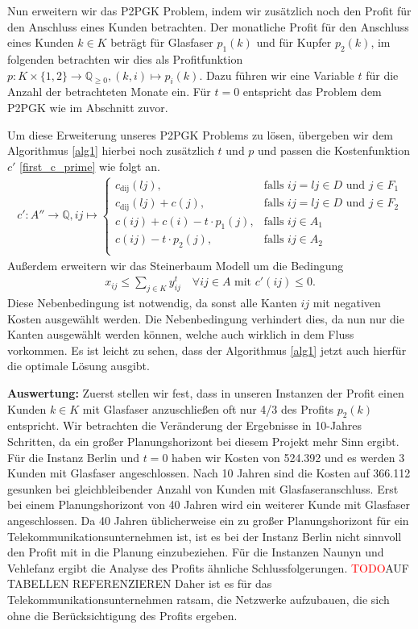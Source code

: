 \documentclass[11pt,a4paper]{article}
\newcommand{\Q}{\mathbb{Q}}
\newcommand{\TODO}{\textcolor{red}{TODO}}
\theoremstyle{my_th_style1}
\begin{document}
Nun erweitern wir das P2PGK Problem, indem wir zusätzlich noch den Profit für den Anschluss eines Kunden betrachten.
Der monatliche Profit für den Anschluss eines Kunden $k \in K$ beträgt für Glasfaser $p_1(k)$ und für Kupfer $p_2(k)$, im folgenden betrachten wir dies als Profitfunktion $p:K \times \{1,2\} \rightarrow \Q_{ \geq 0 },(k,i) \mapsto p_i(k)$.
Dazu führen wir eine Variable $t$ für die Anzahl der betrachteten Monate ein.
Für $t=0$ entspricht das Problem dem P2PGK wie im Abschnitt zuvor.

Um diese Erweiterung unseres P2PGK Problems zu lösen, übergeben wir dem Algorithmus \ref{alg1} hierbei noch zusätzlich $t$ und $p$ und passen die Kostenfunktion \(c'\) \eqref{first_c_prime} wie folgt an.
\begin{align*}
c': A'' \rightarrow \Q, ij \mapsto \left\{\begin{array}{cl} 
c_{\text{dij}}(lj), & \text{falls } ij = lj \in D \text{ und } j \in F_1\\ 
c_{\text{dij}}(lj)+c(j), & \text{falls } ij = lj \in D \text{ und } j \in F_2\\ 
c(ij) + c(i) - t \cdot p_1(j), & \text{falls } ij \in A_1\\ 
c(ij) - t \cdot p_2(j), & \text{falls } ij \in A_2\\ 
\end{array}
\right.
\end{align*}
Außerdem erweitern wir das Steinerbaum Modell um die Bedingung 
\begin{align*}
	x_{ij} \leq \displaystyle\sum_{j \in K} y_{ij}^t \quad \forall ij \in A \text{ mit } c'(ij) \leq 0.
\end{align*}
Diese Nebenbedingung ist notwendig, da sonst alle Kanten $ij$ mit negativen Kosten ausgewählt werden.
Die Nebenbedingung verhindert dies, da nun nur die Kanten ausgew\"ahlt werden können, welche auch wirklich in dem Fluss vorkommen.
Es ist leicht zu sehen, dass der Algorithmus \ref{alg1} jetzt auch hierfür die optimale Lösung ausgibt. 

\textbf{Auswertung:}
Zuerst stellen wir fest, dass in unseren Instanzen der Profit einen Kunden $k \in K$ mit Glasfaser anzuschließen oft nur 4/3 des Profits $p_2(k)$ entspricht. 
Wir betrachten die Veränderung der Ergebnisse in 10-Jahres Schritten, da ein großer Planungshorizont bei diesem Projekt mehr Sinn ergibt.
Für die Instanz Berlin und $t=0$ haben wir Kosten von 524.392 und es werden 3 Kunden mit Glasfaser angeschlossen.
Nach 10 Jahren sind die Kosten auf 366.112 gesunken bei gleichbleibender Anzahl von Kunden mit Glasfaseranschluss.
Erst bei einem Planungshorizont von 40 Jahren wird ein weiterer Kunde mit Glasfaser angeschlossen.
Da 40 Jahren \"ublicherweise ein zu großer Planungshorizont f\"ur ein Telekommunikationsunternehmen ist, ist es bei der Instanz Berlin nicht sinnvoll den Profit mit in die Planung einzubeziehen.
Für die Instanzen Naunyn und Vehlefanz ergibt die Analyse des Profits \"ahnliche Schlussfolgerungen. \TODO AUF TABELLEN REFERENZIEREN
Daher ist es f\"ur das Telekommunikationsunternehmen ratsam, die Netzwerke aufzubauen, die sich ohne die Ber\"ucksichtigung des Profits ergeben.
\end{document}
